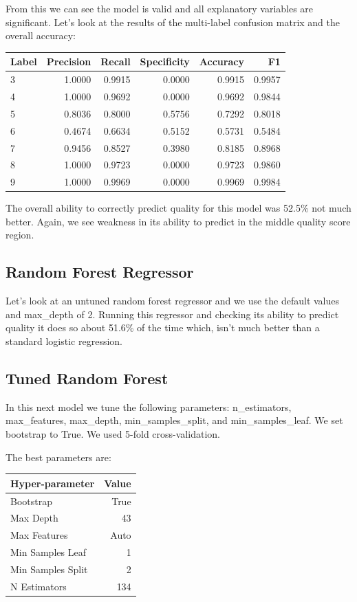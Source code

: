 \documentclass[]{article}
\begin{document}
From this we can see the model is valid and all explanatory variables are significant.  Let's look at the results of the multi-label confusion matrix and the overall accuracy:
\begin{table}[h]
	\centering
	\begin{tabular}{|l | r| r | r | r | r |}
		\hline
		Label & Precision & Recall & Specificity & Accuracy & F1 \\
		\hline		
3 & 1.0000 & 0.9915 & 0.0000 & 0.9915 & 0.9957 \\ 
4 & 1.0000 & 0.9692 & 0.0000 & 0.9692 & 0.9844 \\ 
5 & 0.8036 & 0.8000 & 0.5756 & 0.7292 & 0.8018 \\ 
6 & 0.4674 & 0.6634 & 0.5152 & 0.5731 & 0.5484 \\ 
7 & 0.9456 & 0.8527 & 0.3980 & 0.8185 & 0.8968 \\ 
8 & 1.0000 & 0.9723 & 0.0000 & 0.9723 & 0.9860 \\ 
9 & 1.0000 & 0.9969 & 0.0000 & 0.9969 & 0.9984 \\ 
\hline
\end{tabular}		
\end{table}
 
 The overall ability to correctly predict quality for this model was 52.5\% not much better.  Again, we see weakness in its ability to predict in the middle quality score region.

\subsection{Random Forest Regressor}
Let's look at an untuned random forest regressor and we use the default values and max{\_}depth of 2.  Running this regressor and checking its ability to predict quality it does so about 51.6\% of the time which, isn't much better than a standard logistic regression.

\subsection{Tuned Random Forest}
In this next model we tune the following parameters: n{\_}estimators, max{\_}features, max{\_}depth, min{\_}samples{\_}split, and min{\_}samples{\_}leaf.  We set bootstrap to True. We used 5-fold cross-validation.


The best parameters are:
\begin{table}[h]
	\centering
	\begin{tabular}{|l | r|}
		\hline
		Hyper-parameter & Value\\
		\hline		
		Bootstrap & True \\ 
		Max Depth & 43 \\ 
		Max Features & Auto  \\ 
		Min Samples Leaf & 1 \\ 
		Min Samples Split & 2  \\ 
		N Estimators & 134  \\ 
		\hline
	\end{tabular}		
\end{table}
\end{document}

